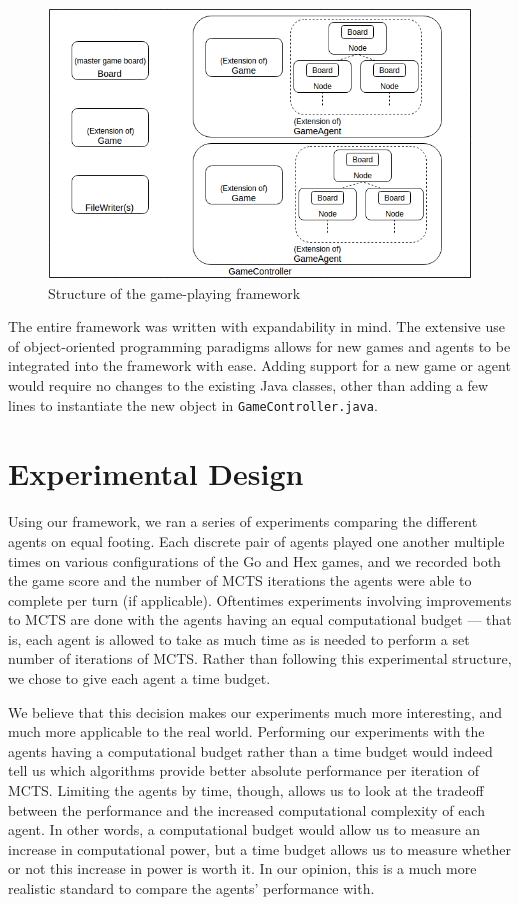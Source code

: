 \begin{figure}[h]
\centering
\includegraphics[scale=0.58]{images/finalframework.png}
\caption{Structure of the game-playing framework}
\label{fig:finalframework}
\end{figure}

The entire framework was written with expandability in mind.  The extensive use of object-oriented programming paradigms allows for new games and agents to be integrated into the framework with ease.  Adding support for a new game or agent would require no changes to the existing Java classes, other than adding a few lines to instantiate the new object in \texttt{GameController.java}.

\section{Experimental Design}

Using our framework, we ran a series of experiments comparing the different agents on equal footing.  Each discrete pair of agents played one another multiple times on various configurations of the Go and Hex games, and we recorded both the game score and the number of MCTS iterations the agents were able to complete per turn (if applicable).  Oftentimes experiments involving improvements to MCTS are done with the agents having an equal computational budget --- that is, each agent is allowed to take as much time as is needed to perform a set number of iterations of MCTS.  Rather than following this experimental structure, we chose to give each agent a time budget.

We believe that this decision makes our experiments much more interesting, and much more applicable to the real world.  Performing our experiments with the agents having a computational budget rather than a time budget would indeed tell us which algorithms provide better absolute performance per iteration of MCTS.  Limiting the agents by time, though, allows us to look at the tradeoff between the performance and the increased computational complexity of each agent.  In other words, a computational budget would allow us to measure an increase in computational power, but a time budget allows us to measure whether or not this increase in power is worth it.  In our opinion, this is a much more realistic standard to compare the agents' performance with.

